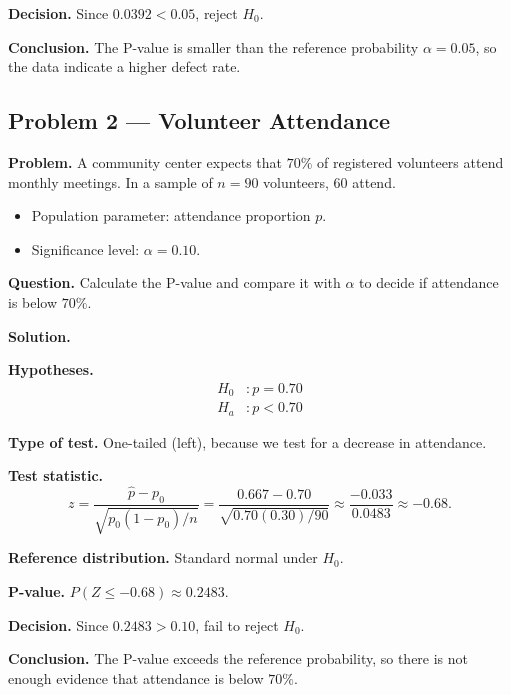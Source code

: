 	\textbf{Decision.} Since $0.0392<0.05$, reject $H_0$.
	
	\textbf{Conclusion.} The P-value is smaller than the reference probability $\alpha=0.05$, so the data indicate a higher defect rate.
	
	\hypertarget{c7-ex2}{}
	\subsection*{Problem 2 — Volunteer Attendance}
	
	\textbf{Problem.} A community center expects that $70\%$ of registered volunteers attend monthly meetings. In a sample of $n=90$ volunteers, $60$ attend.
	\begin{itemize}
		\item Population parameter: attendance proportion $p$.
		\item Significance level: $\alpha=0.10$.
	\end{itemize}
	
	\textbf{Question.} Calculate the P-value and compare it with $\alpha$ to decide if attendance is below $70\%$.
	
	\textbf{Solution.}
	
	\textbf{Hypotheses.}
	\[
	\begin{aligned}
		H_0&: p = 0.70 \\
		H_a&: p < 0.70
	\end{aligned}
	\]
	
	\textbf{Type of test.} One-tailed (left), because we test for a decrease in attendance.
	
	\textbf{Test statistic.}
	\[
	z = \frac{\hat{p}-p_0}{\sqrt{p_0(1-p_0)/n}} = \frac{0.667-0.70}{\sqrt{0.70(0.30)/90}} \approx \frac{-0.033}{0.0483} \approx -0.68.
	\]
	
	\textbf{Reference distribution.} Standard normal under $H_0$.
	
	\textbf{P-value.} $P(Z\le -0.68)\approx 0.2483$.
	
	\textbf{Decision.} Since $0.2483>0.10$, fail to reject $H_0$.
	
	\textbf{Conclusion.} The P-value exceeds the reference probability, so there is not enough evidence that attendance is below $70\%$.
	
	
	\hypertarget{c8-ex1}{}
